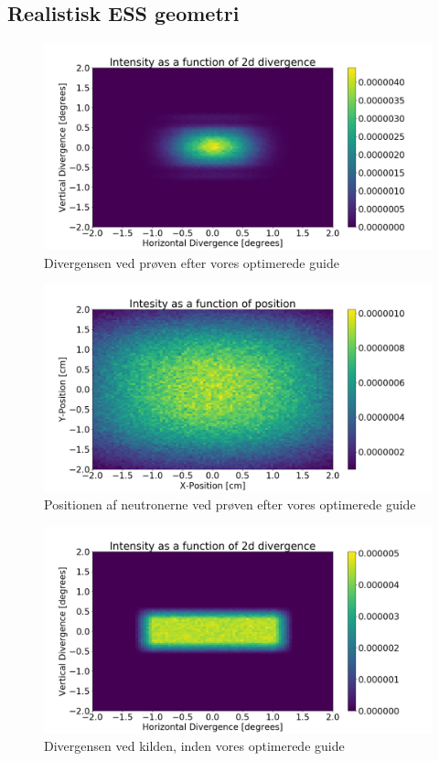 \documentclass[12pt,oneside,a4paper]{article}
\begin{document}
{{{{{\subsection{Realistisk ESS geometri}

\begin{figure}[H]
\centering
\includegraphics[width=1\textwidth]{div_after_ess_brill_optimized.png}
\caption{Divergensen ved prøven efter vores optimerede guide}
\end{figure}

\begin{figure}[H]
\centering
\includegraphics[width=1\textwidth]{psd_after_ess_brill_optimized.png}
\caption{Positionen af neutronerne ved prøven efter vores optimerede guide}
\end{figure}

\begin{figure}[H]
\centering
\includegraphics[width=1\textwidth]{div_before_ess_brill_optimized.png}
\caption{Divergensen ved kilden, inden vores optimerede guide}
\end{figure}

}}}}}
\end{document}
